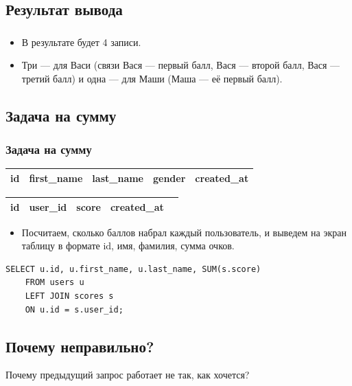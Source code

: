 \documentclass[compress,red]{beamer}
\begin{document}
\subsection{Результат вывода}
\begin{frame}[fragile]
  \frametitle{}
  \begin{itemize}
    \item В результате будет 4 записи.
    \item Три --- для Васи (связи Вася --- первый балл, Вася --- второй балл, Вася --- третий балл) и одна --- для Маши (Маша --- её первый балл).
  \end{itemize}
\end{frame}

\subsection{Задача на сумму}
\begin{frame}[fragile]
  \frametitle{Задача на сумму}
  \begin{table}
    \begin{tabular}{|c|c|c|c|c|}
      \hline
      id & first\_name & last\_name & gender & created\_at\\
      \hline
    \end{tabular}
  \end{table}
  \begin{table}
    \begin{tabular}{|c|c|c|c|c|}
      \hline
      id & user\_id & score & created\_at\\
      \hline
    \end{tabular}
  \end{table}
  \begin{itemize}
    \item Посчитаем, сколько баллов набрал каждый пользователь, и выведем на экран таблицу в формате id, имя, фамилия, сумма очков.
  \end{itemize}
  \scriptsize{
  \begin{lstlisting}[label=sql4,caption=LEFT JOIN]
    SELECT u.id, u.first_name, u.last_name, SUM(s.score) 
    FROM users u 
    LEFT JOIN scores s
    ON u.id = s.user_id;
  \end{lstlisting}
  }
\end{frame}

\subsection{Почему неправильно?}
\begin{frame}
  \begin{center}
    \Huge{Почему предыдущий запрос работает не так, как хочется?}
  \end{center}
\end{frame}
\end{document}
